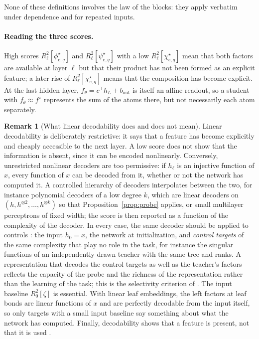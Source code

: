 \documentclass[11pt]{article}
\theoremstyle{definition}
\newtheorem{remark}[theorem]{Remark}
\numberwithin{equation}{section}
\begin{document}
None of these definitions involves the law of the blocks: they apply verbatim under dependence and for repeated inputs.

\paragraph{Reading the three scores.}
High scores $R^2_\ell[\phi^\star_{e,q}]$ and $R^2_\ell[\psi^\star_{e,q}]$ with a low $R^2_\ell[\chi^\star_{e,q}]$ mean that both factors are available at layer $\ell$ but that their product has not been formed as an explicit feature; a later rise of $R^2_\ell[\chi^\star_{e,q}]$ means that the composition has become explicit. At the last hidden layer, $f_\theta=c^\top h_L+b_{\mathrm{out}}$ is itself an affine readout, so a student with $f_\theta\approx f^\star$ represents the sum of the atoms there, but not necessarily each atom separately.

\begin{remark}[What linear decodability does and does not mean]\label{rem:probe-meaning}
Linear decodability is deliberately restrictive: it says that a feature has become explicitly and cheaply accessible to the next layer. A low score does not show that the information is absent, since it can be encoded nonlinearly. Conversely, unrestricted nonlinear decoders are too permissive: if $h_\ell$ is an injective function of $x$, every function of $x$ can be decoded from it, whether or not the network has computed it. A controlled hierarchy of decoders interpolates between the two, for instance polynomial decoders of a low degree $k$, which are linear decoders on $(h,h^{\otimes2},\dots,h^{\otimes k})$ so that Proposition~\ref{prop:probe} applies, or small multilayer perceptrons of fixed width; the score is then reported as a function of the complexity of the decoder. In every case, the same decoder should be applied to controls \citep{alain2016understanding}: the input $h_0=x$, the network at initialization, and \emph{control targets} of the same complexity that play no role in the task, for instance the singular functions of an independently drawn teacher with the same tree and ranks. A representation that decodes the control targets as well as the teacher's factors reflects the capacity of the probe and the richness of the representation rather than the learning of the task; this is the selectivity criterion of \citet{hewitt2019designing}. The input baseline $R^2_0[\zeta]$ is essential. With linear leaf embeddings, the left factors at leaf bonds are linear functions of $x$ and are perfectly decodable from the input itself, so only targets with a small input baseline say something about what the network has computed. Finally, decodability shows that a feature is present, not that it is used \citep[Section~7.3]{hfl_surrogate}.
\end{remark}
\end{document}
